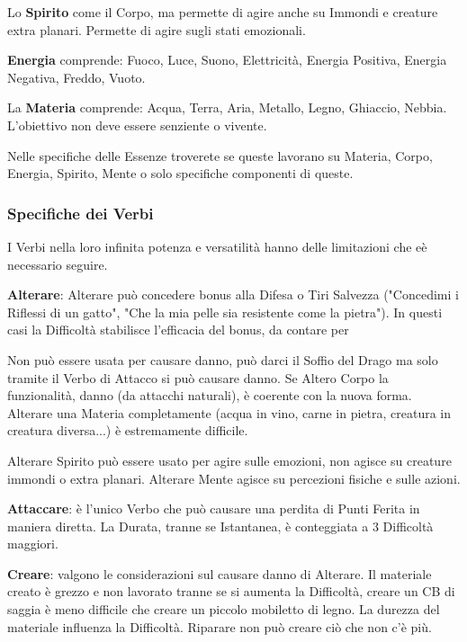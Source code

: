 \documentclass[a4paper,twoside,openany]{book}
\begin{document}
\begin{multicols}{2}
Lo \textbf{Spirito} come il Corpo, ma permette di agire anche su Immondi e creature extra planari. Permette di agire sugli stati emozionali.

\textbf{Energia} comprende: Fuoco, Luce, Suono, Elettricità, Energia Positiva, Energia Negativa, Freddo, Vuoto.

La \textbf{Materia} comprende: Acqua, Terra, Aria, Metallo, Legno, Ghiaccio, Nebbia. L'obiettivo non deve essere senziente o vivente.

\bigskip

Nelle specifiche delle Essenze troverete se queste lavorano su Materia, Corpo, Energia, Spirito, Mente o solo specifiche componenti di queste.

\subsubsection{Specifiche dei Verbi}

I Verbi nella loro infinita potenza e versatilità hanno delle limitazioni che eè necessario seguire.

\textbf{Alterare}:  Alterare può concedere bonus alla Difesa o Tiri Salvezza ("Concedimi i Riflessi di un gatto", "Che la mia pelle sia resistente come la pietra"). In questi casi la Difficoltà stabilisce l'efficacia del bonus, da contare per

Non può essere usata per causare danno, può darci il Soffio del Drago ma solo tramite il Verbo di Attacco si può causare danno. Se Altero Corpo la funzionalità, danno (da attacchi naturali), è coerente con la nuova forma.
Alterare una Materia completamente (acqua in vino, carne in pietra, creatura in creatura diversa...) è estremamente difficile.

Alterare Spirito può essere usato per agire sulle emozioni, non agisce su creature immondi o extra planari. Alterare Mente agisce su percezioni fisiche e sulle azioni.

\textbf{Attaccare}: è l'unico Verbo che può causare una perdita di Punti Ferita in maniera diretta. La Durata, tranne se Istantanea, è conteggiata a 3 Difficoltà maggiori.

\textbf{Creare}: valgono le considerazioni sul causare danno di Alterare. Il materiale creato è grezzo e non lavorato tranne se si aumenta la Difficoltà, creare un CB di saggia è meno difficile che creare un piccolo mobiletto di legno. La durezza del materiale influenza la Difficoltà. Riparare non può creare ciò che non c'è più.


\end{multicols}
\end{document}

